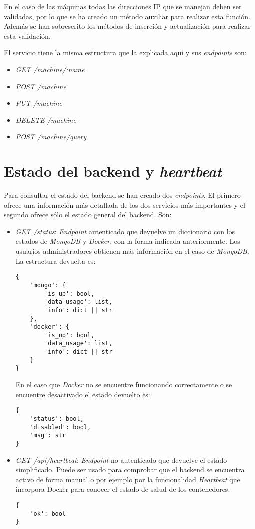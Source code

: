 \bigskip
En el caso de las máquinas todas las direcciones IP que se manejan deben ser validadas, por lo que se ha creado un método auxiliar para realizar esta función. Además se han sobrescrito los métodos de inserción y actualización para realizar esta validación.

\bigskip
El servicio tiene la misma estructura que la explicada \hyperref[sec:servicios]{aquí} y sus \textit{endpoints} son:
\begin{itemize}
	\item \textit{GET /machine/:name}
	\item \textit{POST /machine}
	\item \textit{PUT /machine}
	\item \textit{DELETE /machine}
	\item \textit{POST /machine/query}
\end{itemize}



\section{Estado del backend y \textit{heartbeat}}


Para consultar el estado del backend se han creado dos \textit{endpoints}. El primero ofrece una información más detallada de los dos servicios más importantes y el segundo ofrece sólo el estado general del backend. Son:
\begin{itemize}
	\item \textit{GET /status}: \textit{Endpoint} autenticado que devuelve un diccionario con los estados de \textit{MongoDB} y \textit{Docker}, con la forma indicada anteriormente. Los usuarios administradores obtienen más información en el caso de \textit{MongoDB}. La estructura devuelta es:

\begin{lstlisting}
{
	'mongo': {
		'is_up': bool,
		'data_usage': list,
		'info': dict || str
	},
	'docker': {
		'is_up': bool,
		'data_usage': list,
		'info': dict || str
	}
}
\end{lstlisting}

\bigskip	
En el caso que \textit{Docker} no se encuentre funcionando correctamente o se encuentre desactivado el estado devuelto es:
	
\begin{lstlisting}
{
	'status': bool,
	'disabled': bool,
	'msg': str
}
\end{lstlisting}
	
	\item \textit{GET /api/heartbeat}: \textit{Endpoint} no autenticado que devuelve el estado simplificado. Puede ser usado para comprobar que el backend se encuentra activo de forma manual o por ejemplo por la funcionalidad \textit{Heartbeat} que incorpora Docker para conocer el estado de salud de los contenedores.
	
\begin{lstlisting}
{
	'ok': bool
}
\end{lstlisting}
\end{itemize}



